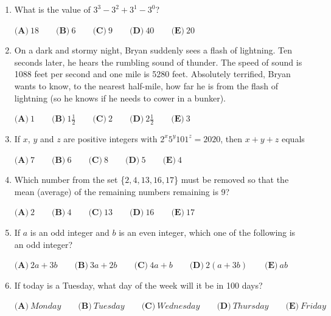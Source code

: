 \documentclass[12pt]{article}
\begin{document}
\begin{enumerate}
    \item What is the value of $3^3 - 3^2 + 3^1 - 3^0$?
    
    $\textbf{(A)}\ 18 \qquad \textbf{(B)}\ 6 \qquad \textbf{(C)}\ 9\qquad \textbf{(D)}\ 40\qquad \textbf{(E)}\ 20$
    
    \item On a dark and stormy night, Bryan suddenly sees a flash of lightning. Ten seconds later, he hears the rumbling sound of thunder. The speed of sound is 1088 feet per second and one mile is 5280 feet. Absolutely terrified, Bryan wants to know, to the nearest half-mile, how far he is from the flash of lightning (so he knows if he needs to cower in a bunker).
    
    $\textbf{(A)}\ 1 \qquad \textbf{(B)}\ 1 \frac{1}{2} \qquad \textbf{(C)}\ 2 \qquad \textbf{(D)}\ 2 \frac{1}{2} \qquad \textbf{(E)}\ 3$
    
    \item If $x$, $y$ and $z$ are positive integers with $2^x5^y101^z = 2020$, then $x+y+z$ equals
    
    $\textbf{(A)}\ 7 \qquad \textbf{(B)}\ 6 \qquad \textbf{(C)}\ 8 \qquad \textbf{(D)}\ 5 \qquad \textbf{(E)}\ 4$
        
     \item Which number from the set \{$2, 4, 13, 16, 17$\} must be removed so that the mean (average) of the remaining numbers remaining is 9?
    
    $\textbf{(A)}\ 2 \qquad \textbf{(B)}\ 4 \qquad \textbf{(C)}\ 13 \qquad \textbf{(D)}\ 16 \qquad \textbf{(E)}\ 17$
        
     \item If $a$ is an odd integer and $b$ is an even integer, which one of the following is an odd integer?
     
    $\textbf{(A)}\ 2a + 3b \qquad \textbf{(B)}\ 3a + 2b \qquad \textbf{(C)}\ 4a + b \qquad \textbf{(D)}\ 2(a + 3b) \qquad \textbf{(E)}\ ab$
        
    \item  If today is a Tuesday, what day of the week will it be in 100 days?
    
    $\textbf{(A)}\ Monday \qquad \textbf{(B)}\ Tuesday \qquad \textbf{(C)}\ Wednesday\qquad \textbf{(D)}\ Thursday\qquad \textbf{(E)}\ Friday$
        

\end{enumerate}
\end{document}
